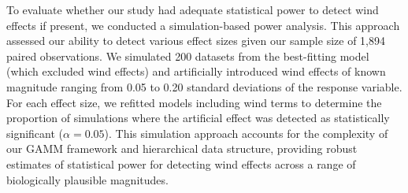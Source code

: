 To evaluate whether our study had adequate statistical power to detect wind effects if present, we conducted a simulation-based power analysis. This approach assessed our ability to detect various effect sizes given our sample size of 1,894 paired observations. We simulated 200 datasets from the best-fitting model (which excluded wind effects) and artificially introduced wind effects of known magnitude ranging from 0.05 to 0.20 standard deviations of the response variable. For each effect size, we refitted models including wind terms to determine the proportion of simulations where the artificial effect was detected as statistically significant ($\alpha = 0.05$). This simulation approach accounts for the complexity of our GAMM framework and hierarchical data structure, providing robust estimates of statistical power for detecting wind effects across a range of biologically plausible magnitudes.

